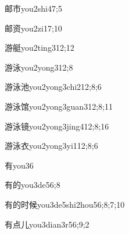 \begin{verbete}{邮市}{you2shi4}{7;5}
\end{verbete}

\begin{verbete}{邮资}{you2zi1}{7;10}
\end{verbete}

\begin{verbete}{游艇}{you2ting3}{12;12}
\end{verbete}

\begin{verbete}{游泳}{you2yong3}{12;8}
\end{verbete}

\begin{verbete}{游泳池}{you2yong3chi2}{12;8;6}
\end{verbete}

\begin{verbete}{游泳馆}{you2yong3guan3}{12;8;11}
\end{verbete}

\begin{verbete}{游泳镜}{you2yong3jing4}{12;8;16}
\end{verbete}

\begin{verbete}{游泳衣}{you2yong3yi1}{12;8;6}
\end{verbete}

\begin{verbete}{有}{you3}{6}
\end{verbete}

\begin{verbete}{有的}{you3de5}{6;8}
\end{verbete}

\begin{verbete}{有的时候}{you3de5shi2hou5}{6;8;7;10}
\end{verbete}

\begin{verbete}{有点儿}{you3dian3r5}{6;9;2}
\end{verbete}

